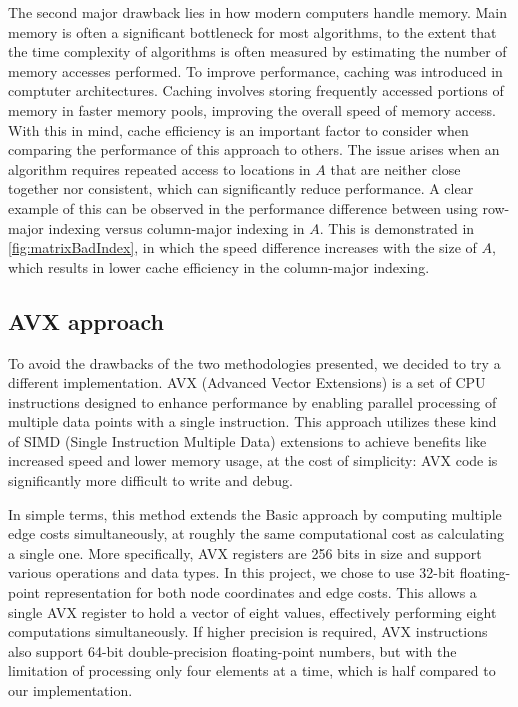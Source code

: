 The second major drawback lies in how modern computers handle memory.
Main memory is often a significant bottleneck for most algorithms, to the extent that the time complexity of algorithms is often measured by estimating the number of memory accesses performed.
To improve performance, caching was introduced in comptuter architectures.
Caching involves storing frequently accessed portions of memory in faster memory pools, improving the overall speed of memory access.
With this in mind, cache efficiency is an important factor to consider when comparing the performance of this approach to others.
The issue arises when an algorithm requires repeated access to locations in $A$ that are neither close together nor consistent, which can significantly reduce performance.
A clear example of this can be observed in the performance difference between using row-major indexing versus column-major indexing in $A$.
This is demonstrated in \figurename{ \ref{fig:matrixBadIndex}}, in which the speed difference increases with the size of $A$, which results in lower cache efficiency in the column-major indexing.

\subsection{AVX approach}
To avoid the drawbacks of the two methodologies presented, we decided to try a different implementation.
AVX (Advanced Vector Extensions)\cite{avxWikipedia} is a set of CPU instructions designed to enhance performance by enabling parallel processing of multiple data points with a single instruction.
This approach utilizes these kind of SIMD (Single Instruction Multiple Data) extensions to achieve benefits like increased speed and lower memory usage, at the cost of simplicity: AVX code is significantly more difficult to write and debug.

In simple terms, this method extends the Basic approach by computing multiple edge costs simultaneously, at roughly the same computational cost as calculating a single one.
More specifically, AVX registers are 256 bits in size and support various operations and data types. 
In this project, we chose to use 32-bit floating-point representation for both node coordinates and edge costs.
This allows a single AVX register to hold a vector of eight values, effectively performing eight computations simultaneously.
If higher precision is required, AVX instructions also support 64-bit double-precision floating-point numbers, but with the limitation of processing only four elements at a time, which is half compared to our implementation.

